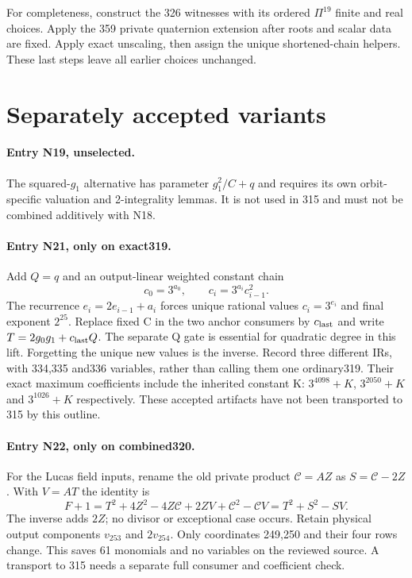 \documentclass{article}
\begin{document}
For completeness, construct the 326 witnesses with its ordered
$\Pi^{19}$ finite and real choices. Apply the 359 private quaternion
extension after roots and scalar data are fixed. Apply exact unscaling,
then assign the unique shortened-chain helpers. These last steps leave
all earlier choices unchanged.

\section{Separately accepted variants}
\label{outline:variants}
\paragraph{Entry N19, unselected.}
The squared-$g_1$ alternative has parameter $g_1^2/C+q$ and requires its
own orbit-specific valuation and 2-integrality lemmas. It is not used in
315 and must not be combined additively with N18.

\paragraph{Entry N21, only on exact319.}
Add $Q=q$ and an output-linear weighted constant chain
\[
 c_0=3^{a_0},\qquad c_i=3^{a_i}c_{i-1}^2.
\]
The recurrence $e_i=2e_{i-1}+a_i$ forces unique rational values
$c_i=3^{e_i}$ and final exponent $2^{25}$. Replace fixed C in the two
anchor consumers by $c_{\rm last}$ and write $T=2g_0g_1+c_{\rm last}Q$.
The separate Q gate is essential for quadratic degree in this lift.
Forgetting the unique new values is the inverse. Record three different
IRs, with 334,335 and336 variables, rather than calling them one ordinary319.
Their exact maximum coefficients include the inherited constant K:
$3^{4098}+K$, $3^{2050}+K$ and $3^{1026}+K$ respectively.
These accepted artifacts have not been transported to 315 by this outline.

\paragraph{Entry N22, only on combined320.}
For the Lucas field inputs, rename the old private product $\mathcal C=AZ$
as $S=\mathcal C-2Z$. With $V=AT$ the identity is
\[
 F+1=T^2+4Z^2-4Z\mathcal C+2ZV+\mathcal C^2-\mathcal CV
     =T^2+S^2-SV.
\]
The inverse adds $2Z$; no divisor or exceptional case occurs. Retain
physical output components $v_{253}$ and $2v_{254}$. Only coordinates
249,250 and their four rows change. This saves 61 monomials and no
variables on the reviewed source. A transport to 315 needs a separate
full consumer and coefficient check.
\end{document}
